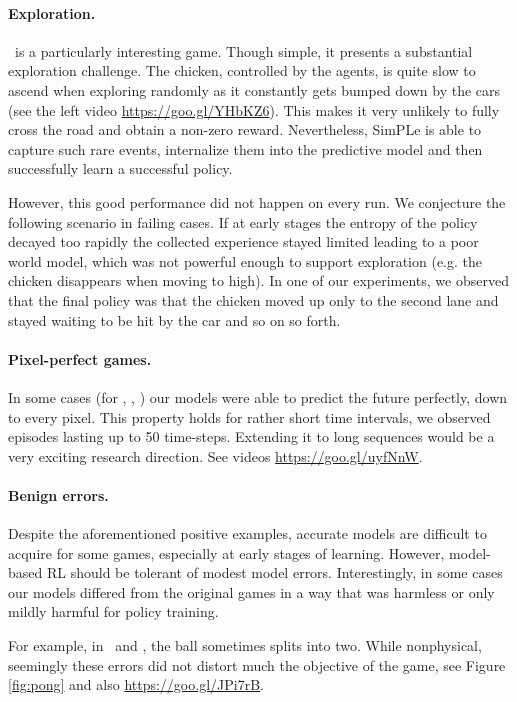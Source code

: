 \paragraph{Exploration.}  \freeway\, is a particularly interesting game. Though simple, it presents a substantial exploration challenge. The chicken, controlled by the agents, is quite slow to ascend when exploring randomly as it constantly gets bumped down by the cars (see the left video \url{https://goo.gl/YHbKZ6}). This makes it very unlikely to fully cross the road and obtain a non-zero reward. Nevertheless, SimPLe is able to capture such rare events, internalize them into the predictive model and then successfully learn a successful policy.

However, this good performance did not happen on every run. We conjecture the following scenario in failing cases. If at early stages the entropy of the policy decayed too rapidly the collected experience stayed limited leading to a poor world model, which was not powerful enough to support exploration (e.g. the chicken disappears when moving to high). In one of our experiments, we observed that the final policy was that the chicken moved up only to the second lane and stayed waiting to be hit by the car and so on so forth. 

\paragraph{Pixel-perfect games.} In some cases (for \pong, \freeway, \breakout) our models were able to predict the future perfectly, down to every pixel. This property holds for rather short time intervals, we observed episodes lasting up to 50 time-steps. Extending it to long sequences would be a very exciting research direction. See videos \url{https://goo.gl/uyfNnW}.

\paragraph{Benign errors.} Despite the aforementioned positive examples, accurate models are difficult to acquire for some games, especially at early stages of learning. However, model-based RL should be tolerant of modest model errors. Interestingly, in some cases our models differed from the original games in a way that was harmless or only mildly harmful for policy training.

For example, in \bowling\, and \pong, the ball sometimes splits into two. While nonphysical, seemingly these errors did not distort much the objective of the game, see Figure \ref{fig:pong} and also \url{https://goo.gl/JPi7rB}.

